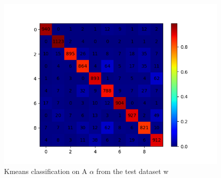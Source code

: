 \documentclass[a4paper,10pt]{article}
\begin{document}
\begin{figure}[h!]
 \centering
 \includegraphics[scale=0.72]{Results/LC-KSVD_X_ALL_K_1024/confusion_matrix_test.png}
 \caption{Kmeans classification on A $\alpha$ from the test dataset w}
\end{figure}
\newpage
\end{document}
